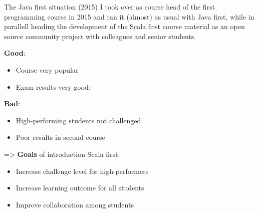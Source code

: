 \documentclass[aspectratio=169]{beamer}
\newenvironment{Slide}[1]%
  {\begin{frame}[environment=Slide]{#1}}
  {\end{frame}}%
\begin{document}
\begin{Slide}{The Java first situation (2015)}
  I took over as course head of the first programming course in 2015 and ran it (almost) as usual with Java first, while in parallell heading the development of the Scala first course material as an open source community project with colleagues and senior students.

  \vspace{0.5em}%
  \begin{minipage}[t]{0.42\textwidth}
      \textbf{Good}:
      \begin{itemize}
        \item Course very popular
        \item Exam results very good:  
      
      \end{itemize}
    \end{minipage}%
    \begin{minipage}[t]{0.6\textwidth}
      \textbf{Bad}:
      \begin{itemize}
        \item High-performing students not challenged
        \item Poor results in second course
      \end{itemize}   
      
      \pause\vspace{0.5em}=> \textbf{Goals} of introduction Scala first:
      \begin{itemize}
        \item Increase challenge level for high-performers 
        \item Increase learning outcome for all students
        \item Improve collaboration among students
      \end{itemize}   
      
    \end{minipage}
\end{Slide}
\end{document}
